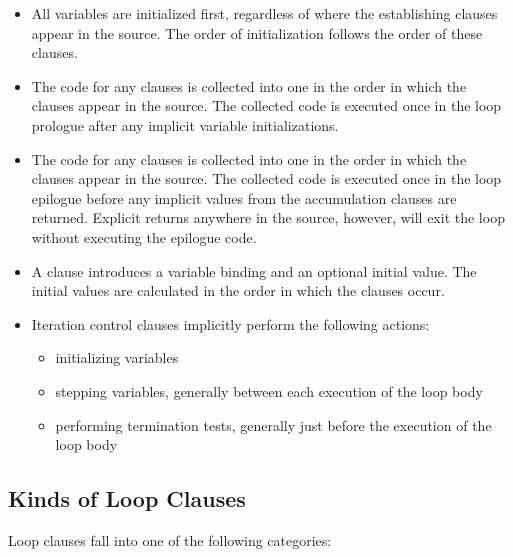   \begin{itemize}

  \item
  All variables are initialized first, regardless of where the establishing
  clauses appear in the source.  The order of initialization follows the
  order of these clauses.

  \item
  The code for any  clauses is collected
  into one  in the order in which the clauses appear in
  the source.  The collected code is executed once in the loop prologue
  after any implicit variable initializations.

  \item
  The code for any  clauses is collected 
  into one  in the order in which the clauses appear in
  the source.  The collected code is executed once in the loop epilogue
  before any implicit values from the accumulation clauses are returned.
  Explicit returns anywhere in the source, however, will exit the loop
  without executing the epilogue code.

  \item 
  A  clause introduces a variable binding and an optional
  initial value.  The initial values are calculated in the order in
  which the  clauses occur.

  \item 
  Iteration control clauses implicitly perform the following actions:
  \begin{itemize}
  \item
  initializing variables

  \item
  stepping variables, generally between each execution of the loop body

  \item
  performing termination tests, generally just before the execution of the
  loop body
  \end{itemize}
  \end{itemize}

  \subsection{Kinds of Loop Clauses}
\label{LOOP-KINDS-SECTION}

  Loop clauses fall into one of the following categories:

